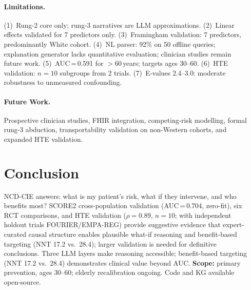\documentclass[runningheads]{llncs}
\begin{document}
\paragraph{Limitations.}
(1)~Rung-2 core only; rung-3 narratives are LLM approximations.
(2)~Linear effects validated for 7 predictors only.
(3)~Framingham validation: 7 predictors, predominantly White cohort.
(4)~NL parser: 92\% on 50 offline queries; explanation generator
lacks quantitative evaluation; clinician studies remain future work.
(5)~AUC\,=\,0.591 for $>$60\,years; targets ages 30--60.
(6)~HTE validation: $n = 10$ subgroups from 2 trials.
(7)~E-values 2.4--3.0: moderate robustness to unmeasured confounding.

\paragraph{Future Work.}
Prospective clinician studies, FHIR integration, competing-risk
modelling, formal rung-3 abduction, transportability validation on
non-Western cohorts, and expanded HTE validation.

\section{Conclusion}\label{sec:conclusion}

NCD-CIE answers: what is my patient's risk, what if they intervene,
and who benefits most?
SCORE2 cross-population validation (AUC\,=\,0.704, zero-fit), six
RCT comparisons, and HTE validation ($\rho = 0.89$, $n = 10$;
with independent holdout trials FOURIER/EMPA-REG)
provide suggestive evidence that expert-curated causal structure
enables plausible what-if reasoning and benefit-based targeting
(NNT 17.2 vs.\ 28.4); larger validation is needed
for definitive conclusions.
Three LLM layers make reasoning accessible; benefit-based targeting
(NNT 17.2 vs.\ 28.4) demonstrates clinical value beyond AUC.
\textbf{Scope:} primary prevention, ages 30--60; elderly
recalibration ongoing. Code and KG available open-source.
\end{document}
